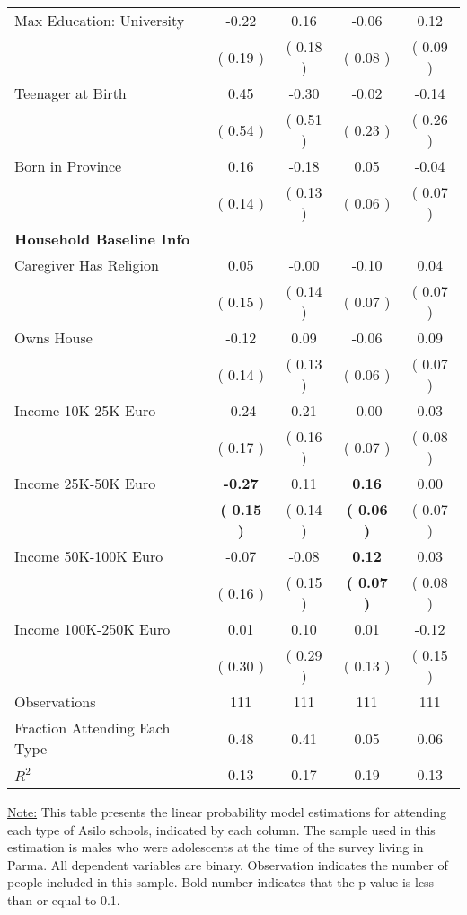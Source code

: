 \begin{table}[H]
{\begin{tabular}{lcccc}
\quad Max Education: University &     -0.22 &      0.16 &     -0.06 &      0.12 \\
\quad  & (     0.19 ) & (     0.18 )  & (     0.08 )  & (     0.09 )  \\
\quad Teenager at Birth &      0.45 &     -0.30 &     -0.02 &     -0.14 \\
\quad  & (     0.54 ) & (     0.51 )  & (     0.23 )  & (     0.26 )  \\
\quad Born in Province &      0.16 &     -0.18 &      0.05 &     -0.04 \\
\quad  & (     0.14 ) & (     0.13 )  & (     0.06 )  & (     0.07 )  \\
\midrule
\textbf{Household Baseline Info} \\
\quad Caregiver Has Religion &      0.05 &     -0.00 &     -0.10 &      0.04 \\
\quad  & (     0.15 ) & (     0.14 )  & (     0.07 )  & (     0.07 )  \\
\quad Owns House &     -0.12 &      0.09 &     -0.06 &      0.09 \\
\quad  & (     0.14 ) & (     0.13 )  & (     0.06 )  & (     0.07 )  \\
\quad Income 10K-25K Euro &     -0.24 &      0.21 &     -0.00 &      0.03 \\
\quad  & (     0.17 ) & (     0.16 )  & (     0.07 )  & (     0.08 )  \\
\quad Income 25K-50K Euro & \textbf{    -0.27} &      0.11 & \textbf{     0.16} &      0.00 \\
\quad  & \textbf{(     0.15 )} & (     0.14 )  & \textbf{(     0.06 )}  & (     0.07 )  \\
\quad Income 50K-100K Euro &     -0.07 &     -0.08 & \textbf{     0.12} &      0.03 \\
\quad  & (     0.16 ) & (     0.15 )  & \textbf{(     0.07 )}  & (     0.08 )  \\
\quad Income 100K-250K Euro &      0.01 &      0.10 &      0.01 &     -0.12 \\
\quad  & (     0.30 ) & (     0.29 )  & (     0.13 )  & (     0.15 )  \\
\midrule
Observations & 111 & 111 & 111 & 111 \\
Fraction Attending Each Type &      0.48 &      0.41 &      0.05 &      0.06 \\
\midrule
$ R^2$ &      0.13 &      0.17 &      0.19 &      0.13 \\
\bottomrule
\end{tabular}}
\end{table}
\begin{footnotesize}
\noindent\underline{Note:} This table presents the linear probability model estimations for attending each type of Asilo schools, indicated by each column. The sample used in this estimation is males who were adolescents at the time of the survey living in Parma. All dependent variables are binary. Observation indicates the number of people included in this sample. Bold number indicates that the p-value is less than or equal to 0.1.
\end{footnotesize}
